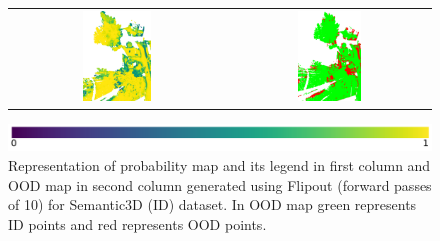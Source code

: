 \begin{figure}[h!]
\begin{tabular}{cc}
            \includegraphics[width=0.33\textwidth, height=0.18\textheight]{images/ood_imgs/fout_sem3d/fout_prob_3.pdf}& 
            \includegraphics[width=0.33\textwidth, height=0.18\textheight]{images/ood_imgs/fout_sem3d/fout_ood_auroc_3.pdf}\\
        \end{tabular}
        \includegraphics[scale=0.45]{images/prob_legend.pdf}
        \caption{Representation of probability map and its legend in first column and OOD map in second column generated using Flipout (forward passes of 10) for Semantic3D (ID) dataset. In OOD map green represents ID points and red represents OOD points.}
        \label{fig:fout_ood_auroc_sem3d_prob}
    \end{figure}

